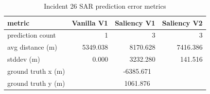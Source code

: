 \begin{table}[ht]
\centering
\caption{Incident 26 SAR prediction error metrics}
\label{tab:sar-incident-26}
\begin{tabular}{lrrr}
\hline
metric & Vanilla V1 & Saliency V1 & Saliency V2 \\
\hline
prediction count & 1 & 3 & 3 \\
avg distance (m) & 5349.038 & 8170.628 & 7416.386 \\
stddev (m) & 0.000 & 3232.280 & 141.516 \\
ground truth x (m) & \multicolumn{3}{c}{-6385.671} \\
ground truth y (m) & \multicolumn{3}{c}{1061.876} \\
\hline
\end{tabular}
\end{table}
